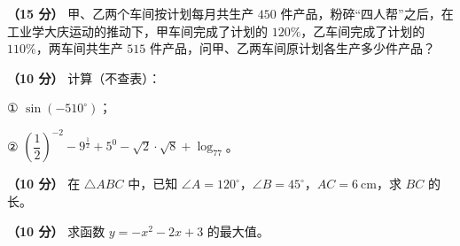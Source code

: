 \begin{question}
\textbf{（15 分）} 甲、乙两个车间按计划每月共生产 $450$ 件产品，粉碎“四人帮”之后，在工业学大庆运动的推动下，甲车间完成了计划的 $120\%$，乙车间完成了计划的 $110\%$，两车间共生产 $515$ 件产品，问甲、乙两车间原计划各生产多少件产品？

\end{question}
\begin{question}
\textbf{（10 分）} 计算（不查表）：

① $\sin(-510^\circ)$；

② $\left(\dfrac12\right)^{-2}-9^{\frac12}+5^0-\sqrt2\cdot\sqrt8+\log_77$。

\Needspace{0.4\textheight}
\end{question}
\begin{question}
\textbf{（10 分）} 在 $\triangle ABC$ 中，已知 $\angle A=120^\circ$，$\angle B=45^\circ$，$AC=6\ \mathrm{cm}$，求 $BC$ 的长。
\nopagebreak[4]
\begin{center}\end{center}
\nopagebreak[4]
\end{question}
\begin{question}
\textbf{（10 分）} 求函数 $y=-x^2-2x+3$ 的最大值。

\end{question}